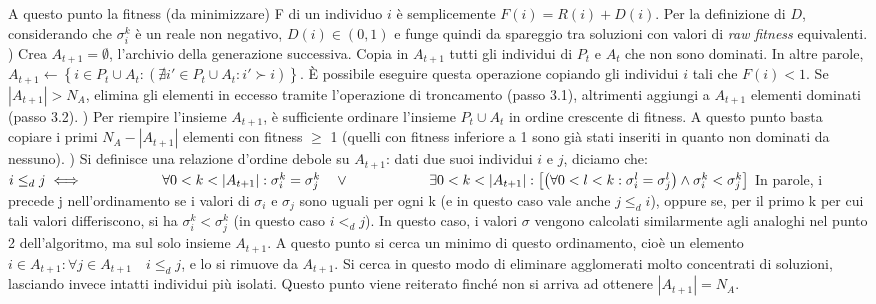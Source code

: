 \documentclass[12pt]{article}
\begin{document}
A questo punto la fitness (da minimizzare) F di un individuo $i$ è semplicemente $F(i) = R(i) + D(i)$.\newline
Per la definizione di $D$, considerando che $\sigma_i^k$ è un reale non negativo, $D(i) \in \left( 0, 1 \right)$ e funge quindi da spareggio tra soluzioni con valori di \textit{raw fitness} equivalenti. \newline
\tab {}) Crea $A_{t+1} = \emptyset$, l'archivio della generazione successiva. Copia in $A_{t+1}$ tutti gli individui di $P_t$ e $A_t$ che non sono dominati. In altre parole, $A_{t+1} \leftarrow \left\{ i \in P_t \cup A_t : \left( \nexists i' \in P_t \cup A_t : i' \succ i \right) \right\}$. È possibile eseguire questa operazione copiando gli individui $i$ tali che $F(i) < 1$. Se $|A_{t+1}| > N_A$, elimina gli elementi in eccesso tramite l'operazione di troncamento (passo 3.1), altrimenti aggiungi a $A_{t+1}$ elementi dominati (passo 3.2). \newline
\tab {}) Per riempire l'insieme $A_{t+1}$, è sufficiente ordinare l'insieme $P_t \cup A_t$ in ordine crescente di fitness. A questo punto basta copiare i primi $N_A - |A_{t+1}|$ elementi con fitness $\geq$ 1 (quelli con fitness inferiore a 1 sono già stati inseriti in quanto non dominati da nessuno). \newline
\tab {}) Si definisce una relazione d'ordine debole su $A_{t+1}$: dati due suoi individui $i$ e $j$, diciamo che: \newline
\newline
$i \leq_d j \iff \newline
\hspace*{2cm} \forall  0 < k < |A_{t+1}| : \sigma_i^k = \sigma_j^k \quad \lor \newline
\hspace*{2cm} \exists 0 < k < |A_{t+1}| : \left[ \left( \forall 0 < l < k : \sigma_i^l = \sigma_j^l \right) \land \sigma_i^k < \sigma_j^k \right]$ \newline 
\newline
In parole, i precede j nell'ordinamento se i valori di $\sigma_i$ e $\sigma_j$ sono uguali per ogni k (e in questo caso vale anche $j \leq_d i$), oppure se, per il primo k per cui tali valori differiscono, si ha $\sigma_i^k < \sigma_j^k$ (in questo caso $i <_d j$).
In questo caso, i valori $\sigma$ vengono calcolati similarmente agli analoghi nel punto 2 dell'algoritmo, ma sul solo insieme $A_{t+1}$. A questo punto si cerca un minimo di questo ordinamento, cioè un elemento \newline $i \in A_{t+1} : \forall j \in A_{t+1} \quad i \leq_d j$, e lo si rimuove da $A_{t+1}$. Si cerca in questo modo di eliminare agglomerati molto concentrati di soluzioni, lasciando invece intatti individui più isolati. Questo punto viene reiterato finché non si arriva ad ottenere $|A_{t+1}| = N_A$. \newline
\end{document}
